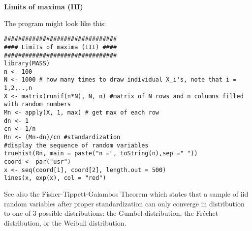 \begin{Solution}{9.8}
\textbf{Limits of maxima (III)}

The program might look like this:
\begin{verbatim}
################################
#### Limits of maxima (III) ####
################################
library(MASS)
n <- 100
N <- 1000 # how many times to draw individual X_i's, note that i = 1,2,..,n
X <- matrix(runif(n*N), N, n) #matrix of N rows and n columns filled with random numbers
Mn <- apply(X, 1, max) # get max of each row
dn <- 1
cn <- 1/n
Rn <- (Mn-dn)/cn #standardization
#display the sequence of random variables
truehist(Rn, main = paste("n =", toString(n),sep =" "))
coord <- par("usr")
x <- seq(coord[1], coord[2], length.out = 500)
lines(x, exp(x), col = "red")
\end{verbatim}
See also the Fisher-Tippett-Galambos Theorem which states that a sample of iid random variables after proper standardization can only converge in distribution to one of 3 possible distributions: the Gumbel distribution, the Fréchet distribution, or the Weibull distribution.
\end{Solution}
